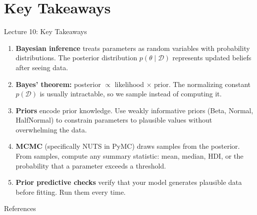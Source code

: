 \documentclass[aspectratio=169, 11pt]{beamer}
\begin{document}
\section{Key Takeaways}


\begin{frame}{Lecture 10: Key Takeaways}
  \begin{keybox}
    {\small
    \begin{enumerate}
      \item \textbf{Bayesian inference} treats parameters as random variables
            with probability distributions. The posterior distribution
            $p(\theta \mid \mathcal{D})$ represents updated beliefs after seeing data.

      \item \textbf{Bayes' theorem:} posterior $\propto$ likelihood $\times$ prior.
            The normalizing constant $p(\mathcal{D})$ is usually intractable,
            so we sample instead of computing it.

      \item \textbf{Priors} encode prior knowledge. Use weakly informative priors
            (Beta, Normal, HalfNormal) to constrain parameters to plausible values
            without overwhelming the data.

      \item \textbf{MCMC} (specifically NUTS in PyMC) draws samples from the posterior.
            From samples, compute any summary statistic: mean, median, HDI, or
            the probability that a parameter exceeds a threshold.

      \item \textbf{Prior predictive checks} verify that your model generates plausible
            data before fitting. Run them every time.
    \end{enumerate}
    }
  \end{keybox}
\end{frame}

\begin{frame}[allowframebreaks]{References}
  \printbibliography[heading=none]
\end{frame}

\end{document}
